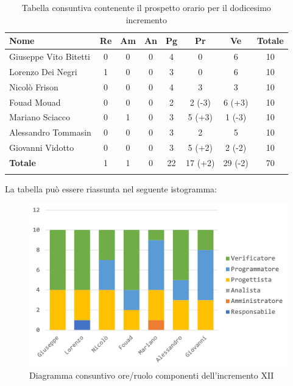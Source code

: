 		\begin{longtable}{|l|c|c|c|c|c|c|c|}
			\hline
			\rowcolor{lighter-grayer}
			\textbf{Nome} & \textbf{Re} & \textbf{Am} & \textbf{An} & \textbf{Pg}  & \textbf{Pr}   & \textbf{Ve} & \textbf{Totale} \\
			\hline
			\endfirsthead
			
			\hline
			Giuseppe Vito Bitetti 		 & 0 & 0 & 0 & 4 & 0 & 6 & 10\\
			\hline
			\hline
			Lorenzo Dei Negri			 & 1 & 0 & 0 & 3 & 0 & 6 & 10\\
			\hline
			\hline
			Nicolò Frison				      & 0 & 0 & 0 & 4 & 3 & 3 & 10\\
			\hline
			\hline
			Fouad Mouad 				   & 0 & 0 & 0 & 2 & 2 (-3) & 6 (+3) & 10\\
			\hline
			\hline
			Mariano Sciacco 			 & 0 & 1 & 0 & 3 & 5 (+3) & 1 (-3) & 10\\
			\hline
			\hline
			Alessandro Tommasin    & 0 & 0 & 0 & 3 & 2 & 5 & 10\\
			\hline
			\hline
			Giovanni Vidotto 			  & 0 & 0 & 0 & 3 & 5 (+2) & 2 (-2) & 10\\
			\hline 
			\textbf{Totale}			 		& 1 & 1 & 0 & 22 & 17 (+2) & 29 (-2) & 70\\
			\hline
			\caption{Tabella consuntiva contenente il prospetto orario per il dodicesimo incremento}
		\end{longtable}
		\pagebreak
		
		La tabella può essere riassunta nel seguente istogramma:
		\begin{figure}[H]
			\centering
			\includegraphics[width=0.8\linewidth]{./images/consuntivo/ConsIncr12-1.png}
			\caption{Diagramma consuntivo ore/ruolo componenti dell'incremento XII}
			\label{fig:consuntivo diagramma suddivione ruoli incremento XII}
		\end{figure}
		

